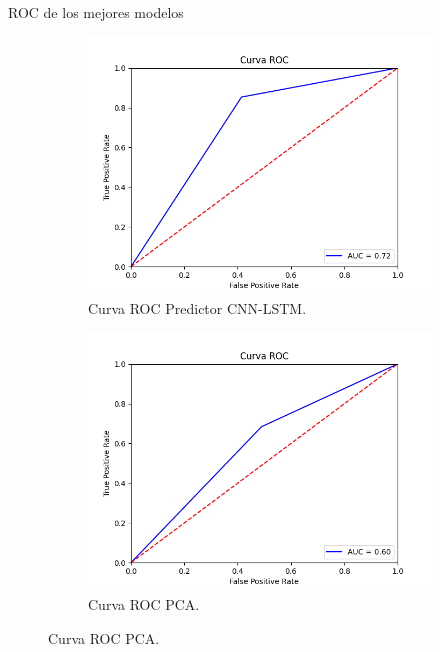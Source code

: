 \documentclass[10pt]{beamer}
\begin{document}
\begin{frame}[fragile]{ROC de los mejores modelos}
	\begin{figure}[H]
		\centering
		\begin{subfigure}{.49\textwidth}
			\centering
			\includegraphics[scale=0.27]{Imagenes/Predictor-CNN-LSTM_roc.png}
			\caption{Curva ROC Predictor CNN-LSTM.}
		\end{subfigure}
		\begin{subfigure}{.49\textwidth}
			\centering
			\includegraphics[scale=0.27]{Imagenes/PCA_roc.png}
			\caption{Curva ROC PCA.}
		\end{subfigure}
	\end{figure}
	
\end{frame}
\end{document}
